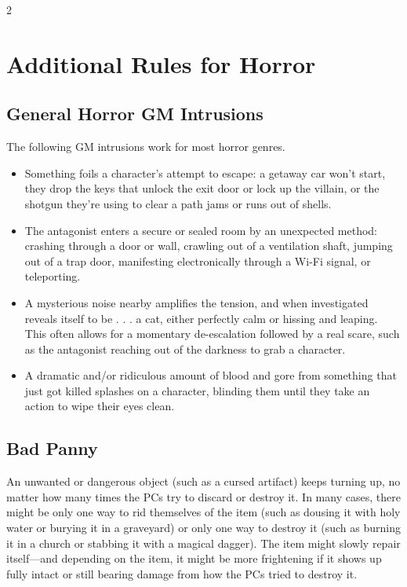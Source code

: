 \begin{multicols}{2}

\chapter{Additional Rules for Horror}

\section{General Horror GM Intrusions}

The following GM intrusions work for most horror genres.

\begin{itemize}
\item Something foils a character’s attempt to escape: a getaway car won’t start, they drop the keys that unlock the exit door or lock up the villain, or the shotgun they’re using to clear a path jams or runs out of shells.
\item The antagonist enters a secure or sealed room by an unexpected method: crashing through a door or wall, crawling out of a ventilation shaft, jumping out of a trap door, manifesting electronically through a Wi-Fi signal, or teleporting.
\item A mysterious noise nearby amplifies the tension, and when investigated reveals itself to
be . . . a cat, either perfectly calm or hissing and leaping. This often allows for a momentary de-escalation followed by a real scare, such as the antagonist reaching out of the darkness to grab a character.
\item A dramatic and/or ridiculous amount of blood and gore from something that just got killed splashes on a character, blinding them until they take an action to wipe their eyes clean.
\end{itemize}

\section{Bad Panny}

An unwanted or dangerous object (such as a cursed artifact) keeps turning up, no matter how many times the PCs try to discard or destroy it. In many cases, there might be only one way to rid themselves of the item (such as dousing it with holy water or burying it in a graveyard) or only one way to destroy it (such as burning it in a church or stabbing it with a magical dagger). The item might slowly repair itself—and depending on the item, it might be more frightening if it shows up fully intact or still bearing damage from how the PCs tried to destroy it.


\end{multicols}

